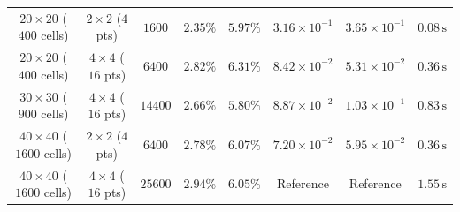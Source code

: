 \documentclass[preprint,12pt]{elsarticle}
\begin{document}
\begin{table}[!htbp]
{\begin{tabular}{@{} c c c c c c c c @{}}
            \midrule
            $20 \times 20$ ($400$ cells)  & $2 \times 2$ ($4$ pts)  & $1600$             & $2.35\%$                                      & $5.97\%$                                                & $3.16 \times 10^{-1}$                                                                  & $3.65 \times 10^{-1}$                                                                  & $0.08\,\mathrm{s}$          \\
            $20 \times 20$ ($400$ cells)  & $4 \times 4$ ($16$ pts) & $6400$             & $2.82\%$                                      & $6.31\%$                                                & $8.42 \times 10^{-2}$                                                                  & $5.31 \times 10^{-2}$                                                                  & $0.36\,\mathrm{s}$          \\
            \midrule
            $30 \times 30$ ($900$ cells)  & $4 \times 4$ ($16$ pts) & $14400$            & $2.66\%$                                      & $5.80\%$                                                & $8.87 \times 10^{-2}$                                                                  & $1.03 \times 10^{-1}$                                                                  & $0.83\,\mathrm{s}$          \\
            $40 \times 40$ ($1600$ cells) & $2 \times 2$ ($4$ pts)  & $6400$             & $2.78\%$                                      & $6.07\%$                                                & $7.20 \times 10^{-2}$                                                                  & $5.95 \times 10^{-2}$                                                                  & $0.36\,\mathrm{s}$          \\
            $40 \times 40$ ($1600$ cells) & $4 \times 4$ ($16$ pts) & $25600$            & $2.94\%$                                      & $6.05\%$                                                & Reference                                                                              & Reference                                                                              & $1.55\,\mathrm{s}$          \\
            \bottomrule
        \end{tabular}%
    }
\end{table}
\end{document}
